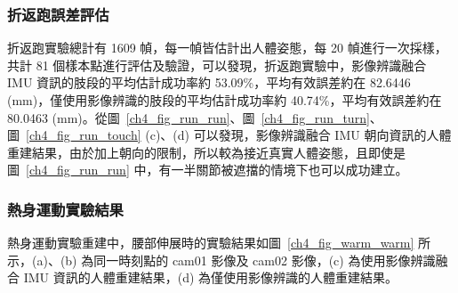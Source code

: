 \subsubsection*{折返跑誤差評估}
折返跑實驗總計有 1609 幀，每一幀皆估計出人體姿態，每 20 幀進行一次採樣，共計 81 個樣本點進行評估及驗證，可以發現，折返跑實驗中，影像辨識融合 IMU 資訊的肢段的平均估計成功率約 53.09\%，平均有效誤差約在 82.6446 (mm)，僅使用影像辨識的肢段的平均估計成功率約 40.74\%，平均有效誤差約在 80.0463 (mm)。從圖~\ref{ch4_fig_run_run}、圖~\ref{ch4_fig_run_turn}、圖~\ref{ch4_fig_run_touch} (c)、(d) 可以發現，影像辨識融合 IMU 朝向資訊的人體重建結果，由於加上朝向的限制，所以較為接近真實人體姿態，且即使是圖~\ref{ch4_fig_run_run} 中，有一半關節被遮擋的情境下也可以成功建立。

\clearpage

\subsubsection*{熱身運動實驗結果}
熱身運動實驗重建中，腰部伸展時的實驗結果如圖~\ref{ch4_fig_warm_warm} 所示，(a)、(b) 為同一時刻點的 cam01 影像及 cam02 影像，(c) 為使用影像辨識融合 IMU 資訊的人體重建結果，(d) 為僅使用影像辨識的人體重建結果。

